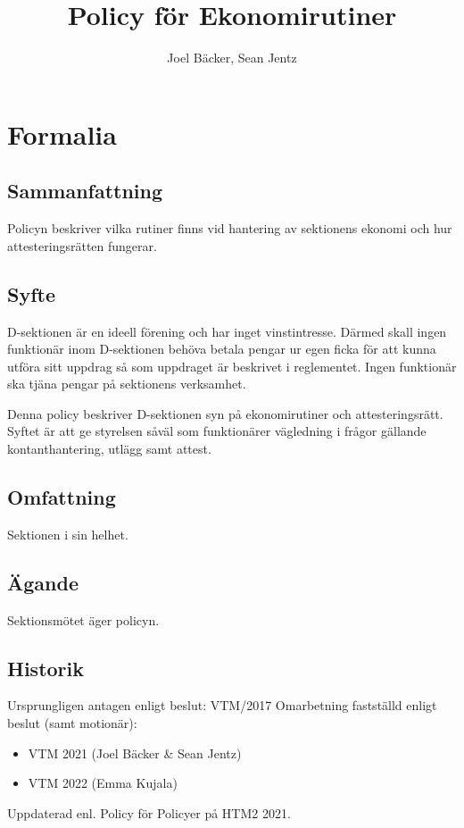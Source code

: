 \documentclass{dsekprotokoll}
\title{Policy för Ekonomirutiner}
\author{Joel Bäcker, Sean Jentz}
\begin{document}
\maketitle
\section{Formalia}
\subsection{Sammanfattning}
Policyn beskriver vilka rutiner finns vid hantering av sektionens ekonomi och hur attesteringsrätten fungerar.
\subsection{Syfte}
D-sektionen är en ideell förening och har inget vinstintresse. Därmed skall ingen funktionär inom D-sektionen behöva betala pengar ur egen ficka för att kunna utföra sitt uppdrag så som uppdraget är beskrivet i reglementet. Ingen funktionär ska tjäna pengar på sektionens verksamhet.

\par Denna policy beskriver D-sektionen syn på ekonomirutiner och attesteringsrätt. Syftet är att ge styrelsen såväl som funktionärer vägledning i frågor gällande kontanthantering, utlägg samt attest.
\subsection{Omfattning}
Sektionen i sin helhet.
\subsection{Ägande}
Sektionsmötet äger policyn.
\subsection{Historik}
Ursprungligen antagen enligt beslut: VTM/2017
Omarbetning fastställd enligt beslut (samt motionär):
\begin{itemize}
\item VTM 2021 (Joel Bäcker \& Sean Jentz)
\item VTM 2022 (Emma Kujala)
\end{itemize}
Uppdaterad enl. Policy för Policyer på HTM2 2021.


\end{document}
